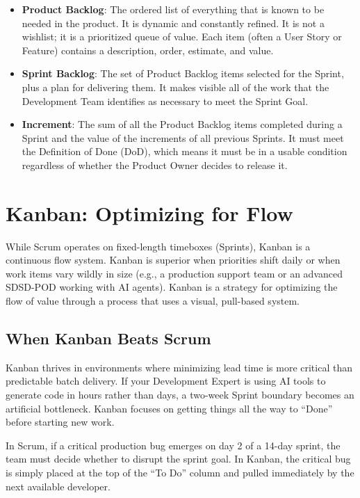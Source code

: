 \documentclass[
  11pt,
  openany,
  oneside]{book}
\providecommand{\tightlist}{%
  \setlength{\itemsep}{0pt}\setlength{\parskip}{0pt}}
\begin{document}
\begin{itemize}
\tightlist
\item
  \textbf{Product Backlog}: The ordered list of everything that is known
  to be needed in the product. It is dynamic and constantly refined. It
  is not a wishlist; it is a prioritized queue of value. Each item
  (often a User Story or Feature) contains a description, order,
  estimate, and value.
\item
  \textbf{Sprint Backlog}: The set of Product Backlog items selected for
  the Sprint, plus a plan for delivering them. It makes visible all of
  the work that the Development Team identifies as necessary to meet the
  Sprint Goal.
\item
  \textbf{Increment}: The sum of all the Product Backlog items completed
  during a Sprint and the value of the increments of all previous
  Sprints. It must meet the Definition of Done (DoD), which means it
  must be in a usable condition regardless of whether the Product Owner
  decides to release it.
\end{itemize}

\section{Kanban: Optimizing for Flow}\label{kanban-optimizing-for-flow}

While Scrum operates on fixed-length timeboxes (Sprints), Kanban is a
continuous flow system. Kanban is superior when priorities shift daily
or when work items vary wildly in size (e.g., a production support team
or an advanced SDSD-POD working with AI agents). Kanban is a strategy
for optimizing the flow of value through a process that uses a visual,
pull-based system.

\subsection{When Kanban Beats Scrum}\label{when-kanban-beats-scrum}

Kanban thrives in environments where minimizing lead time is more
critical than predictable batch delivery. If your Development Expert is
using AI tools to generate code in hours rather than days, a two-week
Sprint boundary becomes an artificial bottleneck. Kanban focuses on
getting things all the way to ``Done'' before starting new work.

In Scrum, if a critical production bug emerges on day 2 of a 14-day
sprint, the team must decide whether to disrupt the sprint goal. In
Kanban, the critical bug is simply placed at the top of the ``To Do''
column and pulled immediately by the next available developer.
\end{document}
